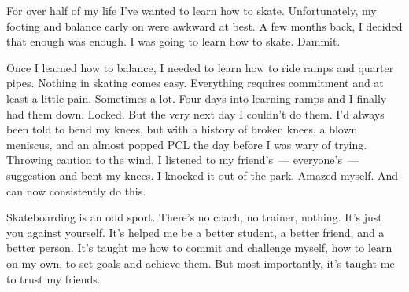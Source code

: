 For over half of my life I've wanted to learn how to skate. Unfortunately, my footing and balance early on were awkward at best. A few months back, I decided that enough was enough. I was going to learn how to skate. Dammit.

Once I learned how to balance, I needed to learn how to ride ramps and quarter pipes. Nothing in skating comes easy. Everything requires commitment and at least a little pain. Sometimes a lot. Four days into learning ramps and I finally had them down. Locked. But the very next day I couldn't do them. I'd always been told to bend my knees, but with a history of broken knees, a blown meniscus, and an almost popped PCL the day before I was wary of trying. Throwing caution to the wind, I listened to my friend's~--- everyone's~--- suggestion and bent my knees. I knocked it out of the park. Amazed myself. And can now consistently do this.

Skateboarding is an odd sport. There's no coach, no trainer, nothing. It's just you against yourself. It's helped me be a better student, a better friend, and a better person. It's taught me how to commit and challenge myself, how to learn on my own, to set goals and achieve them. But most importantly, it's taught me to trust my friends.
